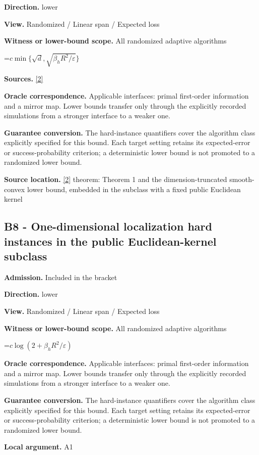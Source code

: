 \documentclass[10pt,a4paper]{article}
\newcommand{\AtlasMath}[1]{\par\begingroup\centering\setbox0=\hbox{$\displaystyle #1$}\ifdim\wd0>1.4\linewidth\typeout{ATLAS WIDE FORMULA: \the\wd0}\fi\ifdim\wd0>\linewidth\resizebox{\linewidth}{!}{\box0}\else\box0\fi\par\endgroup}
\begin{document}
\textbf{Direction.} lower

\textbf{View.} Randomized / Linear span / Expected loss

\textbf{Witness or lower-bound scope.} All randomized adaptive algorithms

\AtlasMath{c\min\{\sqrt d,\sqrt{\beta_hR^2/\varepsilon}\}}
\textbf{Sources.} \href{https://arxiv.org/pdf/2609.10874}{[2]}

\textbf{Oracle correspondence.} Applicable interfaces: primal first-order information and a mirror map. Lower bounds transfer only through the explicitly recorded simulations from a stronger interface to a weaker one.

\textbf{Guarantee conversion.} The hard-instance quantifiers cover the algorithm class explicitly specified for this bound. Each target setting retains its expected-error or success-probability criterion; a deterministic lower bound is not promoted to a randomized lower bound.

\textbf{Source location.} \href{https://arxiv.org/pdf/2609.10874}{[2]} theorem: Theorem 1 and the dimension-truncated smooth-convex lower bound, embedded in the subclass with a fixed public Euclidean kernel

\subsection{B8 - One-dimensional localization hard instances in the public Euclidean-kernel subclass}
\textbf{Admission.} Included in the bracket

\textbf{Direction.} lower

\textbf{View.} Randomized / Linear span / Expected loss

\textbf{Witness or lower-bound scope.} All randomized adaptive algorithms

\AtlasMath{c\log(2+\beta_hR^2/\varepsilon)}
\textbf{Oracle correspondence.} Applicable interfaces: primal first-order information and a mirror map. Lower bounds transfer only through the explicitly recorded simulations from a stronger interface to a weaker one.

\textbf{Guarantee conversion.} The hard-instance quantifiers cover the algorithm class explicitly specified for this bound. Each target setting retains its expected-error or success-probability criterion; a deterministic lower bound is not promoted to a randomized lower bound.

\textbf{Local argument.} A1
\end{document}
